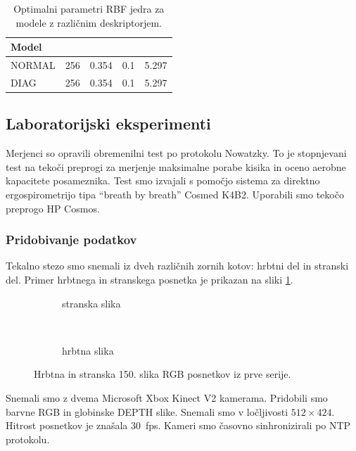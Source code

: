 \begin{table}[htb]
	\centering
	\begin{tabular}{l S[table-format=3] S[table-format=1.3] S[table-format=1.1] S[table-format=1.3]}
		\toprule
		\textbf{Model} &  & \thead{$\mathbf{\gamma}$} & \thead{$\mathbf{\nu}$} &  \\ 
		\midrule
		NORMAL & 256 & 0.354 & 0.1 & 5.297 \\
		DIAG & 256 & 0.354 & 0.1 & 5.297 \\
		\bottomrule
	\end{tabular}
	\caption[Optimalni parameteri RBF jedra modelov za izbiro deskriptorjev]{Optimalni parametri RBF jedra za modele z različnim deskriptorjem.}
	\label{tab:izbira-param-diag}
\end{table}


\subsection{Laboratorijski eksperimenti}
Merjenci so opravili obremenilni test po protokolu Nowatzky. To je stopnjevani test na tekoči preprogi za merjenje maksimalne porabe kisika in oceno aerobne kapacitete posameznika. Test smo izvajali s pomočjo sistema za direktno ergospirometrijo tipa ``breath  by breath'' Cosmed K4B2. Uporabili smo  tekočo  preprogo HP Cosmos.

\subsubsection{Pridobivanje podatkov}
Tekalno stezo smo snemali iz dveh različnih zornih kotov: hrbtni del in stranski del.  Primer hrbtnega in stranskega posnetka je prikazan na sliki \ref{fig:primer-posnetka-stage2}.

\begin{figure}[htb]
	\centering
	\begin{subfigure}{0.45\columnwidth}
		\caption{stranska slika}
	\end{subfigure}
	~
	\begin{subfigure}{0.45\columnwidth}
		\caption{hrbtna slika}
	\end{subfigure}
	\caption{Hrbtna in stranska 150. slika RGB posnetkov iz prve serije.}
	\label{fig:primer-posnetka-stage2}
\end{figure}

Snemali smo z dvema Microsoft Xbox Kinect V2 kamerama. Pridobili smo barvne RGB in globinske DEPTH slike. Snemali smo v ločljivosti $512 \times 424$. Hitrost posnetkov je znašala \SI{30}{fps}. Kameri smo časovno sinhronizirali po NTP protokolu.

